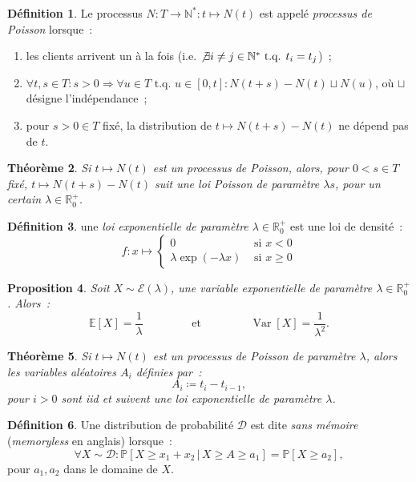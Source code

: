 \documentclass{article}
\newtheorem{thm}{Théorème}[section]
\newtheorem{prp}[thm]{Proposition}
\theoremstyle{definition}
\newtheorem{déf}[thm]{Définition}
\theoremstyle{remark}
\DeclareMathOperator{\Var}{Var}
\renewcommand{\P}{\mathbb P}
\newcommand{\E}{\mathbb E}
\newcommand{\N}{\mathbb N}
\newcommand{\R}{\mathbb R}
\newcommand{\tq}{\text{ t.q. }}
\begin{document}
	\begin{déf} Le processus $N : T \to \N^* : t \mapsto N(t)$ est appelé \textit{processus de Poisson} lorsque~:
	\begin{enumerate}
		\item les clients arrivent un à la fois (i.e. $\not \exists i \neq j \in \N^* \tq t_i = t_j$)~;
		\item $\forall t, s \in T : s > 0 \Rightarrow \forall u \in T \tq u \in [0, t] : N(t+s)-N(t) \sqcup N(u)$, où $\sqcup$ désigne l'indépendance~;
		\item pour $s > 0 \in T$ fixé, la distribution de $t \mapsto N(t+s)-N(t)$ ne dépend pas de $t$.
	\end{enumerate}
	\end{déf}

	\begin{thm} Si $t \mapsto N(t)$ est un processus de Poisson, alors, pour $0 < s \in T$ fixé, $t \mapsto N(t+s)-N(t)$ suit une loi Poisson de paramètre
	$\lambda s$, pour un certain $\lambda \in \R_0^+$.
	\end{thm}

	\begin{déf} une \textit{loi exponentielle de paramètre $\lambda \in \R_0^+$} est une loi de densité~:
	\[f : x \mapsto \begin{cases}0 &\text{ si } x < 0 \\\lambda\exp(-\lambda x) &\text{ si } x \geq 0\end{cases}\]
	\end{déf}

	\begin{prp} Soit $X \sim \mathcal E(\lambda)$, une variable exponentielle de paramètre $\lambda \in \R_0^+$. Alors~:
	\[\E[X] = \frac 1\lambda \qquad\qquad \text{ et } \qquad\qquad \Var[X] = \frac 1{\lambda^2}.\]
	\end{prp}

	\begin{thm} Si $t \mapsto N(t)$ est un processus de Poisson de paramètre $\lambda$, alors les variables aléatoires $A_i$ définies par~:
	\[A_i \coloneqq t_i - t_{i-1},\]
	pour $i > 0$ sont iid et suivent une loi exponentielle de paramètre $\lambda$.
	\end{thm}

	\begin{déf} Une distribution de probabilité $\mathcal D$ est dite \textit{sans mémoire} (\textit{memoryless} en anglais) lorsque~:
	\[\forall X \sim \mathcal D : \P[X \geq x_1 + x_2 \, | \, X \geq A \geq a_1] = \P[X \geq a_2],\]
	pour $a_1, a_2$ dans le domaine de $X$.
	\end{déf}
\end{document}
